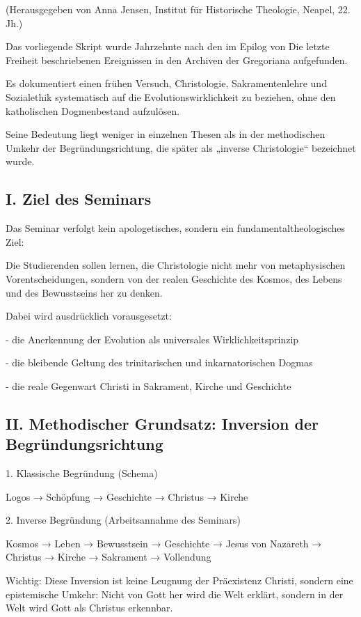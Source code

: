 \documentclass[
  ngerman,
]{article}
\begin{document}
(Herausgegeben von Anna Jensen, Institut für Historische Theologie,
Neapel, 22. Jh.)

Das vorliegende Skript wurde Jahrzehnte nach den im Epilog von Die
letzte Freiheit beschriebenen Ereignissen in den Archiven der Gregoriana
aufgefunden.

Es dokumentiert einen frühen Versuch, Christologie, Sakramentenlehre und
Sozialethik systematisch auf die Evolutionswirklichkeit zu beziehen,
ohne den katholischen Dogmenbestand aufzulösen.

Seine Bedeutung liegt weniger in einzelnen Thesen als in der
methodischen Umkehr der Begründungsrichtung, die später als „inverse
Christologie`` bezeichnet wurde.

\subsection{I. Ziel des Seminars}\label{i.-ziel-des-seminars}

Das Seminar verfolgt kein apologetisches, sondern ein
fundamentaltheologisches Ziel:

Die Studierenden sollen lernen, die Christologie nicht mehr von
metaphysischen Vorentscheidungen, sondern von der realen Geschichte des
Kosmos, des Lebens und des Bewusstseins her zu denken.

Dabei wird ausdrücklich vorausgesetzt:

- die Anerkennung der Evolution als universales Wirklichkeitsprinzip

- die bleibende Geltung des trinitarischen und inkarnatorischen Dogmas

- die reale Gegenwart Christi in Sakrament, Kirche und Geschichte

\subsection{II. Methodischer Grundsatz: Inversion der
Begründungsrichtung}\label{ii.-methodischer-grundsatz-inversion-der-begruxfcndungsrichtung}

1. Klassische Begründung (Schema)

Logos → Schöpfung → Geschichte → Christus → Kirche

2. Inverse Begründung (Arbeitsannahme des Seminars)

Kosmos → Leben → Bewusstsein → Geschichte → Jesus von Nazareth →
Christus → Kirche → Sakrament → Vollendung

Wichtig: Diese Inversion ist keine Leugnung der Präexistenz Christi,
sondern eine epistemische Umkehr: Nicht von Gott her wird die Welt
erklärt, sondern in der Welt wird Gott als Christus erkennbar.
\end{document}
